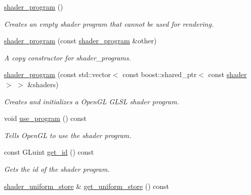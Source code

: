 \begin{DoxyCompactItemize}
\item 
\hyperlink{classoccluded_1_1opengl_1_1retained_1_1shaders_1_1shader__program_a940103083cf5b991c8de690748311dc3}{shader\+\_\+program} ()
\begin{DoxyCompactList}\small\item\em Creates an empty shader program that cannot be used for rendering. \end{DoxyCompactList}\item 
\hyperlink{classoccluded_1_1opengl_1_1retained_1_1shaders_1_1shader__program_aed7d06f2a424ae9e07a298682ce3eed3}{shader\+\_\+program} (const \hyperlink{classoccluded_1_1opengl_1_1retained_1_1shaders_1_1shader__program}{shader\+\_\+program} \&other)
\begin{DoxyCompactList}\small\item\em A copy constructor for shader\+\_\+programs. \end{DoxyCompactList}\item 
\hyperlink{classoccluded_1_1opengl_1_1retained_1_1shaders_1_1shader__program_ac6459ada0453594a47d1294591d26fc5}{shader\+\_\+program} (const std\+::vector$<$ const boost\+::shared\+\_\+ptr$<$ const \hyperlink{classoccluded_1_1opengl_1_1retained_1_1shaders_1_1shader}{shader} $>$ $>$ \&shaders)
\begin{DoxyCompactList}\small\item\em Creates and initializes a Open\+G\+L G\+L\+S\+L shader program. \end{DoxyCompactList}\item 
void \hyperlink{classoccluded_1_1opengl_1_1retained_1_1shaders_1_1shader__program_a92731484e3b37d25b3dc66a3a1871d2e}{use\+\_\+program} () const 
\begin{DoxyCompactList}\small\item\em Tells Open\+G\+L to use the shader program. \end{DoxyCompactList}\item 
const G\+Luint \hyperlink{classoccluded_1_1opengl_1_1retained_1_1shaders_1_1shader__program_a5824dc0a31ac6e1100cfa0677e309020}{get\+\_\+id} () const 
\begin{DoxyCompactList}\small\item\em Gets the id of the shader program. \end{DoxyCompactList}\item 
\hyperlink{classoccluded_1_1opengl_1_1retained_1_1shaders_1_1shader__uniform__store}{shader\+\_\+uniform\+\_\+store} \& \hyperlink{classoccluded_1_1opengl_1_1retained_1_1shaders_1_1shader__program_a2579a141b4bd7528b2303ad61fe772d5}{get\+\_\+uniform\+\_\+store} () const 

\end{DoxyCompactItemize}
